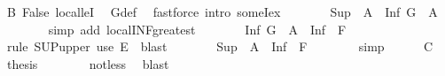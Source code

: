 \begin{isabellebody}
\ B\ False\ local{\isachardot}{\kern0pt}leI\ \isamarkupfalse%
\ G{\isacharunderscore}{\kern0pt}def\ \isamarkupfalse%
\ {\isacharparenleft}{\kern0pt}fastforce\ intro{\isacharcolon}{\kern0pt}\ someI{}{\isacharunderscore}{\kern0pt}ex{\isacharparenright}{\kern0pt}\isanewline
\ \ \ \ \isamarkupfalse%
\ \isamarkupfalse%
\ {\isachardoublequoteopen}{\isasymSqinter}{\isacharparenleft}{\kern0pt}Sup\ {\isacharbackquote}{\kern0pt}\ A{\isacharparenright}{\kern0pt}\ {\isasymle}\ Inf\ {\isacharparenleft}{\kern0pt}G\ {\isacharbackquote}{\kern0pt}\ A{\isacharparenright}{\kern0pt}{\isachardoublequoteclose}\isanewline
\ \ \ \ \ \ \isamarkupfalse%
\ {\isacharparenleft}{\kern0pt}simp\ add{\isacharcolon}{\kern0pt}\ local{\isachardot}{\kern0pt}INF{\isacharunderscore}{\kern0pt}greatest{\isacharparenright}{\kern0pt}\isanewline
\ \ \ \ \isamarkupfalse%
\ \isamarkupfalse%
\ {\isachardoublequoteopen}Inf\ {\isacharparenleft}{\kern0pt}G\ {\isacharbackquote}{\kern0pt}\ A{\isacharparenright}{\kern0pt}\ {\isasymle}\ {\isasymSqunion}{\isacharparenleft}{\kern0pt}Inf\ {\isacharbackquote}{\kern0pt}\ {\isacharquery}{\kern0pt}F{\isacharparenright}{\kern0pt}{\isachardoublequoteclose}\isanewline
\ \ \ \ \ \ \isamarkupfalse%
\ {\isacharparenleft}{\kern0pt}rule\ SUP{\isacharunderscore}{\kern0pt}upper{\isacharparenright}{\kern0pt}\ {\isacharparenleft}{\kern0pt}use\ E\ \ blast{\isacharparenright}{\kern0pt}\isanewline
\ \ \ \ \isamarkupfalse%
\ \isamarkupfalse%
\ {\isachardoublequoteopen}{\isasymSqinter}{\isacharparenleft}{\kern0pt}Sup\ {\isacharbackquote}{\kern0pt}\ A{\isacharparenright}{\kern0pt}\ {\isasymle}\ {\isasymSqunion}{\isacharparenleft}{\kern0pt}Inf\ {\isacharbackquote}{\kern0pt}\ {\isacharquery}{\kern0pt}F{\isacharparenright}{\kern0pt}{\isachardoublequoteclose}\isanewline
\ \ \ \ \ \ \isamarkupfalse%
\ simp\isanewline
\ \ \ \ \isamarkupfalse%
\ C\ \isamarkupfalse%
\ {\isacharquery}{\kern0pt}thesis\isanewline
\ \ \ \ \ \ \isamarkupfalse%
\ not{\isacharunderscore}{\kern0pt}less\ \isamarkupfalse%
\ blast\isanewline
\ \ \isamarkupfalse%
\isanewline
{}\isamarkupfalse%
%
\endisatagproof
{\isafoldproof}%
%
\isadelimproof
\isanewline
%
\endisadelimproof
{}\isamarkupfalse%
\isanewline
%
\isadelimtheory
\isanewline
%
\endisadelimtheory
%
\isatagtheory
{}\isamarkupfalse%
%
\endisatagtheory
{\isafoldtheory}%
%
\isadelimtheory
%
\endisadelimtheory
%
\end{isabellebody}%
